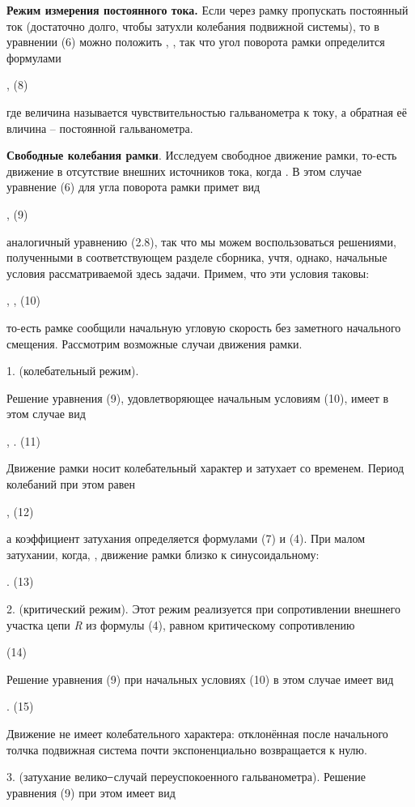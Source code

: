 \documentclass[]{article}
\begin{document}
\textbf{Режим измерения постоянного тока.} Если через рамку пропускать
постоянный ток (достаточно долго, чтобы затухли колебания подвижной
системы), то в уравнении (6) можно положить , , так что угол поворота
рамки определится формулами

, (8)

где величина называется чувствительностью гальванометра к току, а
обратная её вличина -- постоянной гальванометра.

\textbf{Свободные колебания рамки}. Исследуем свободное движение рамки,
то-есть движение в отсутствие внешних источников тока, когда . В этом
случае уравнение (6) для угла поворота рамки примет вид

, (9)

аналогичный уравнению (2.8), так что мы можем воспользоваться решениями,
полученными в соответствующем разделе сборника, учтя, однако, начальные
условия рассматриваемой здесь задачи. Примем, что эти условия таковы:

, , (10)

то-есть рамке сообщили начальную угловую скорость без заметного
начального смещения. Рассмотрим возможные случаи движения рамки.

1. (колебательный режим).

Решение уравнения (9), удовлетворяющее начальным условиям (10), имеет в
этом случае вид

, . (11)

Движение рамки носит колебательный характер и затухает со временем.
Период колебаний при этом равен

, (12)

а коэффициент затухания определяется формулами (7) и (4). При малом
затухании, когда, , движение рамки близко к синусоидальному:

. (13)

2. (критический режим). Этот режим реализуется при сопротивлении
внешнего участка цепи \emph{R} из формулы (4), равном критическому
сопротивлению

(14)

Решение уравнения (9) при начальных условиях (10) в этом случае имеет
вид

. (15)

Движение не имеет колебательного характера: отклонённая после начального
толчка подвижная система почти экспоненциально возвращается к нулю.

3. (затухание велико ̶ случай переуспокоенного гальванометра). Решение
уравнения (9) при этом имеет вид
\end{document}
